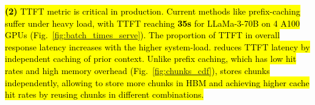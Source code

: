 \hl{\noindent\textbf{(2)} 
TTFT metric is critical in production. Current methods like prefix-caching suffer under heavy load, with TTFT reaching \textbf{35s} for LLaMa-3-70B on 4 A100 GPUs (Fig.~\ref{fig:batch_times_serve}). The proportion of TTFT in overall response latency increases with the higher system-load. \sys reduces TTFT latency by independent caching of prior context. Unlike prefix caching, which has low hit rates and high memory overhead (Fig.~\ref{fig:chunks_cdf}), \sys stores chunks independently, allowing to store more chunks in HBM and achieving higher cache hit rates by reusing chunks in different combinations.}



